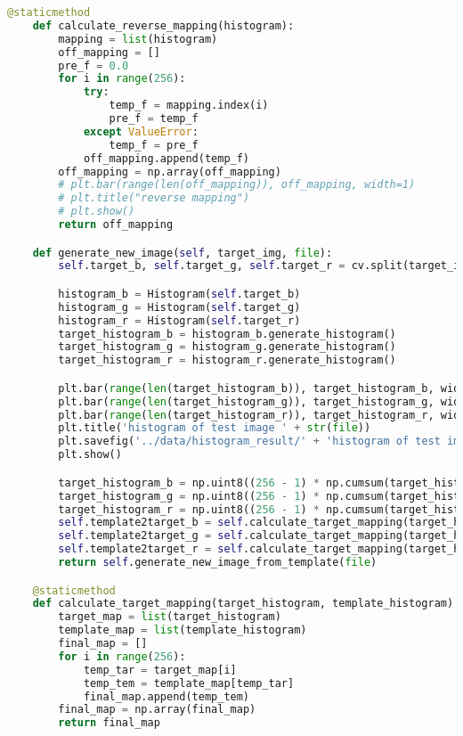\documentclass{hitreport}
\begin{document}
\begin{appendices}
\begin{lstlisting}[language=python]
    @staticmethod
    def calculate_reverse_mapping(histogram):
        mapping = list(histogram)
        off_mapping = []
        pre_f = 0.0
        for i in range(256):
            try:
                temp_f = mapping.index(i)
                pre_f = temp_f
            except ValueError:
                temp_f = pre_f
            off_mapping.append(temp_f)
        off_mapping = np.array(off_mapping)
        # plt.bar(range(len(off_mapping)), off_mapping, width=1)
        # plt.title("reverse mapping")
        # plt.show()
        return off_mapping

    def generate_new_image(self, target_img, file):
        self.target_b, self.target_g, self.target_r = cv.split(target_img)

        histogram_b = Histogram(self.target_b)
        histogram_g = Histogram(self.target_g)
        histogram_r = Histogram(self.target_r)
        target_histogram_b = histogram_b.generate_histogram()
        target_histogram_g = histogram_g.generate_histogram()
        target_histogram_r = histogram_r.generate_histogram()

        plt.bar(range(len(target_histogram_b)), target_histogram_b, width=1, color='b')
        plt.bar(range(len(target_histogram_g)), target_histogram_g, width=1, color='g')
        plt.bar(range(len(target_histogram_r)), target_histogram_r, width=1, color='r')
        plt.title('histogram of test image ' + str(file))
        plt.savefig('../data/histogram_result/' + 'histogram of test image ' + str(file) + '.jpg')
        plt.show()

        target_histogram_b = np.uint8((256 - 1) * np.cumsum(target_histogram_b) + 0.5)
        target_histogram_g = np.uint8((256 - 1) * np.cumsum(target_histogram_g) + 0.5)
        target_histogram_r = np.uint8((256 - 1) * np.cumsum(target_histogram_r) + 0.5)
        self.template2target_b = self.calculate_target_mapping(target_histogram_b, self.histogram_reverse_b)
        self.template2target_g = self.calculate_target_mapping(target_histogram_g, self.histogram_reverse_g)
        self.template2target_r = self.calculate_target_mapping(target_histogram_r, self.histogram_reverse_r)
        return self.generate_new_image_from_template(file)

    @staticmethod
    def calculate_target_mapping(target_histogram, template_histogram):
        target_map = list(target_histogram)
        template_map = list(template_histogram)
        final_map = []
        for i in range(256):
            temp_tar = target_map[i]
            temp_tem = template_map[temp_tar]
            final_map.append(temp_tem)
        final_map = np.array(final_map)
        return final_map


\end{lstlisting}
\end{appendices}
\end{document}

